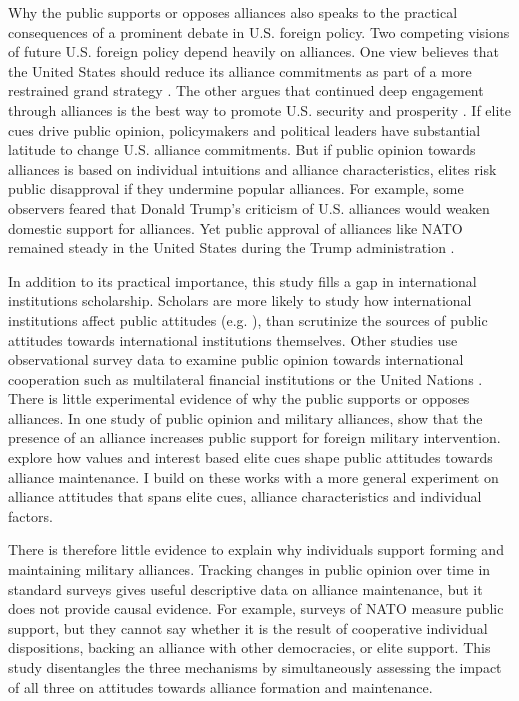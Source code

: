 \documentclass[12pt]{article}
\begin{document}
Why the public supports or opposes alliances also speaks to the practical consequences of a prominent debate in U.S. foreign policy. 
Two competing visions of future U.S. foreign policy depend heavily on alliances. 
One view believes that the United States should reduce its alliance commitments as part of a more restrained grand strategy \citep{Preble2009, Posen2014}.
The other argues that continued deep engagement through alliances is the best way to promote U.S. security and prosperity \citep{Brooksetal2013, BrandsFeaver2017}. 
If elite cues drive public opinion, policymakers and political leaders have substantial latitude to change U.S. alliance commitments. 
But if public opinion towards alliances is based on individual intuitions and alliance characteristics, elites risk public disapproval if they undermine popular alliances.  
For example, some observers feared that Donald Trump's criticism of U.S. alliances would weaken domestic support for alliances.
Yet public approval of alliances like NATO remained steady in the United States during the Trump administration \citep{PewNATO2020}. 


In addition to its practical importance, this study fills a gap in international institutions scholarship. 
Scholars are more likely to study how international institutions affect public attitudes (e.g. \citep{KayaWalker2014, Greenhill2020}), than scrutinize the sources of public attitudes towards international institutions themselves. 
Other studies use observational survey data to examine public opinion towards international cooperation such as multilateral financial institutions \citep{Edwards2009} or the United Nations \citep{Torgler2008, DellmuthTallberg2015}. 
There is little experimental evidence of why the public supports or opposes alliances.
In one study of public opinion and military alliances, \citet{TomzWeeks2021} show that the presence of an alliance increases public support for foreign military intervention. 
\citet{Chuetal2021} explore how values and interest based elite cues shape public attitudes towards alliance maintenance. 
I build on these works with a more general experiment on alliance attitudes that spans elite cues, alliance characteristics and individual factors. 


There is therefore little evidence to explain why individuals support forming and maintaining military alliances. 
Tracking changes in public opinion over time in standard surveys gives useful descriptive data on alliance maintenance, but it  does not provide causal evidence.
For example, surveys of NATO measure public support, but they cannot say whether it is the result of cooperative individual dispositions, backing an alliance with other democracies, or elite support. 
This study disentangles the three mechanisms by simultaneously assessing the impact of all three on attitudes towards alliance formation and maintenance. 
\end{document}
